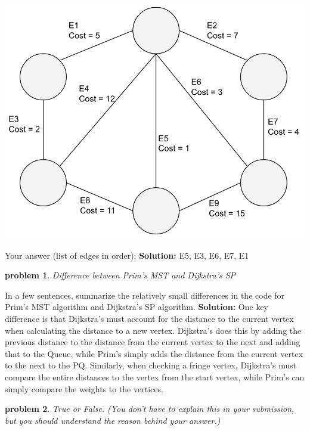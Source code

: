 \documentclass[10pt]{article}
\newcommand{\solution}[1]{\color{blue}\hfill\break\noindent\textbf{Solution:} #1\color{black}}
\newtheorem{problem}{\sc\color{cit}problem}
\begin{document}
\includegraphics[scale=0.4]{graph_MST1}

Your answer (list of edges in order):
\solution{
    E5, E3, E6, E7, E1
}

\begin{problem} Difference between Prim's MST and Dijkstra's SP \end{problem}
In a few sentences, summarize the relatively small differences in the code for Prim's MST algorithm and Dijkstra's SP algorithm.
\solution{
    One key difference is that Dijkstra's must account for the distance to the current vertex when calculating the distance to a new vertex. Dijkstra's does this by adding the previous distance to the distance from the current vertex to the next and adding that to the Queue, while Prim's simply adds the distance from the current vertex to the next to the PQ. Similarly, when checking a fringe vertex, Dijkstra's must compare the entire distances to the vertex from the start vertex, while Prim's can simply compare the weights to the vertices. 
}

\begin{problem} True or False. (You don't have to explain this in your submission, but you should understand the reason behind your answer.)  \end{problem}
\end{document}
